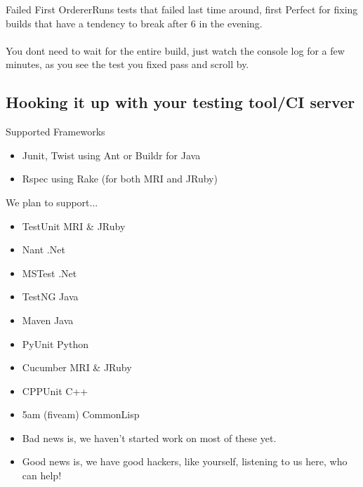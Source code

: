 \documentclass{beamer}
\begin{document}
\begin{frame}{Failed First Orderer}{Runs tests that failed last time around, first}
  Perfect for fixing builds that have a tendency to break after 6 in the evening.\\
  \quad\\
  You dont need to wait for the entire build, just watch the console log for a few minutes, as you see the test you fixed pass and scroll by.
\end{frame}

\subsection{Hooking it up with your testing tool/CI server}

\begin{frame}{Supported Frameworks}
  \begin{centering}
    \begin{itemize}
      \item {\color{green}Junit}, {\color{green}Twist} using {\color{red}Ant} or {\color{red}Buildr} for {\color{blue}Java}
        \pause
      \item {\color{green}Rspec} using {\color{red}Rake} (for both {\color{blue}MRI} and {\color{blue}JRuby})
    \end{itemize}
  \end{centering}
\end{frame}

\begin{frame}{We plan to support...}
  \begin{centering}
    \begin{itemize}
    \item {\color{green}TestUnit} {\color{blue}MRI \& JRuby}
    \item {\color{red}Nant} {\color{blue}.Net}
    \item {\color{green}MSTest} {\color{blue}.Net}
    \item {\color{green}TestNG} {\color{blue}Java}
    \item {\color{red}Maven} {\color{blue}Java}
    \item {\color{green}PyUnit} {\color{blue}Python}
    \item {\color{green}Cucumber} {\color{blue}MRI \& JRuby}
    \item {\color{green}CPPUnit} {\color{blue} C++}
    \item {\color{green} 5am (fiveam)} {\color{blue} CommonLisp}
    \end{itemize}
  \end{centering}
  \pause
  \begin{centering}
    \begin{itemize}
      \item Bad news is, we haven't started work on most of these yet.
        \pause
      \item Good news is, we have good hackers, like yourself, listening to us here, who can help!
    \end{itemize}
  \end{centering}
\end{frame}
\end{document}
